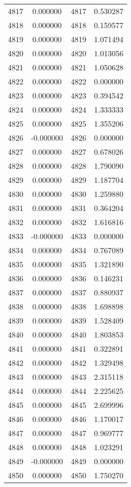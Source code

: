 \documentclass[12pt]{article}
\begin{document}
\begin{longtable}{@{}cccc@{}}
4817 & 0.000000 & 4817 & 0.530287 \\
4818 & 0.000000 & 4818 & 0.159577 \\
4819 & 0.000000 & 4819 & 1.071494 \\
4820 & 0.000000 & 4820 & 1.013056 \\
4821 & 0.000000 & 4821 & 1.050628 \\
4822 & 0.000000 & 4822 & 0.000000 \\
4823 & 0.000000 & 4823 & 0.394542 \\
4824 & 0.000000 & 4824 & 1.333333 \\
4825 & 0.000000 & 4825 & 1.355206 \\
4826 & -0.000000 & 4826 & 0.000000 \\
4827 & 0.000000 & 4827 & 0.678026 \\
4828 & 0.000000 & 4828 & 1.790090 \\
4829 & 0.000000 & 4829 & 1.187704 \\
4830 & 0.000000 & 4830 & 1.259880 \\
4831 & 0.000000 & 4831 & 0.364204 \\
4832 & 0.000000 & 4832 & 1.616816 \\
4833 & -0.000000 & 4833 & 0.000000 \\
4834 & 0.000000 & 4834 & 0.767089 \\
4835 & 0.000000 & 4835 & 1.321890 \\
4836 & 0.000000 & 4836 & 0.146231 \\
4837 & 0.000000 & 4837 & 0.880937 \\
4838 & 0.000000 & 4838 & 1.698898 \\
4839 & 0.000000 & 4839 & 1.528409 \\
4840 & 0.000000 & 4840 & 1.803853 \\
4841 & 0.000000 & 4841 & 0.322891 \\
4842 & 0.000000 & 4842 & 1.329498 \\
4843 & 0.000000 & 4843 & 2.315118 \\
4844 & 0.000000 & 4844 & 2.225625 \\
4845 & 0.000000 & 4845 & 2.699996 \\
4846 & 0.000000 & 4846 & 1.170017 \\
4847 & 0.000000 & 4847 & 0.969777 \\
4848 & 0.000000 & 4848 & 1.023291 \\
4849 & -0.000000 & 4849 & 0.000000 \\
4850 & 0.000000 & 4850 & 1.750270 \\

\end{longtable}
\end{document}
